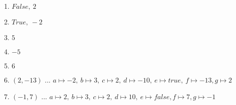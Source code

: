 \begin{enumerate}
    \item $False,\ 2$
    \item $True,\ -2$
    \item $5$
    \item $-5$
    \item $6$
    \item $(2,-13)$ ... $a\mapsto -2,\ b \mapsto 3,\ c\mapsto 2,\ d\mapsto -10,\ e\mapsto true,\ f\mapsto -13, g \mapsto 2$
    \item $(-1,7)$ ... $a\mapsto 2,\ b \mapsto 3,\ c \mapsto 2,\ d\mapsto 10,\ e\mapsto false, f\mapsto 7, g\mapsto -1$
  \end{enumerate}
